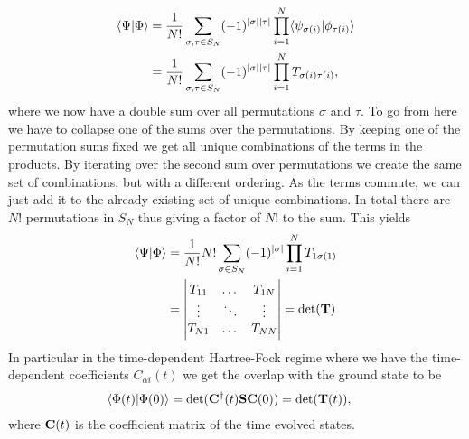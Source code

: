         \begin{align}
            \langle \Psi | \Phi \rangle
            &= \frac{1}{N!}
            \sum_{\sigma, \tau \in S_{N}}
            (-1)^{|\sigma||\tau|}
            \prod_{i = 1}^{N}
            \langle \psi_{\sigma(i)} | \phi_{\tau(i)} \rangle
            \\
            &= \frac{1}{N!}
            \sum_{\sigma, \tau \in S_{N}}
            (-1)^{|\sigma||\tau|}
            \prod_{i = 1}^{N}
            T_{\sigma(i)\tau(i)},
        \end{align}
        where we now have a double sum over all permutations $\sigma$ and
        $\tau$. To go from here we have to collapse one of the sums over the
        permutations. By keeping one of the permutation sums fixed we get all
        unique combinations of the terms in the products. By iterating over the
        second sum over permutations we create the same set of combinations, but
        with a different ordering. As the terms commute, we can just add it to
        the already existing set of unique combinations. In total there are $N!$
        permutations in $S_N$ thus giving a factor of $N!$ to the sum. This
        yields
        \begin{align}
            \langle \Psi | \Phi \rangle
            &= \frac{1}{N!}N!
            \sum_{\sigma \in S_N}
            (-1)^{|\sigma|}
            \prod_{i = 1}^{N}T_{1\sigma(1)}
            \\
            &= \begin{vmatrix}
                T_{11} & \dots & T_{1N} \\
                \vdots & \ddots & \vdots \\
                T_{N1} & \dots & T_{NN}
            \end{vmatrix}
            = \det(\mathbf{T})
        \end{align}
        In particular in the time-dependent Hartree-Fock regime where we have
        the time-dependent coefficients $C_{\alpha i}(t)$ we get the overlap
        with the ground state to be
        \begin{align}
            \langle \Phi(t) | \Phi(0) \rangle
            &= \det(\mathbf{C}^{\dagger}(t)\mathbf{S}\mathbf{C}(0))
            = \det(\mathbf{T}(t)),
        \end{align}
        where $\mathbf{C}(t)$ is the coefficient matrix of the time evolved states.

